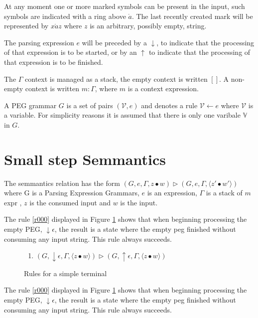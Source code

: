\documentclass[manuscript, review, sigconf]{acmart}
\newcommand{\zpp}[2]{\langle #1\bullet #2 \rangle}
\begin{document}
At any moment one or more marked symbols can be present in the input, such symbols are indicated
with a ring above $\mathring{a}$. The last recently created mark will be represented by $x\mathring{a}z$ where $z$ is an arbitrary, possibly empty, string.

The parsing expression $e$ will be preceded by a $\downarrow$, to indicate that the processing of that expression is to be started, or by an $\uparrow$ to indicate that the processing of that expression is to be finished. 

The $\Gamma$ context is managed as a stack, the empty context is written $[]$. A non-empty context is written $m : \Gamma$, where $m$ is a context expression.  

A PEG grammar $G$ is a set of pairs $(\mathcal{V},e)$ and denotes a rule $\mathcal{V} \leftarrow e$ where $\mathcal{V}$ is a variable. For simplicity reasons it is assumed that there is only one varibale $\mathbb{V}$ in $G$.  

\section{Small step Semmantics} \label{sec:sem}

The semmantics relation has the form $(G, e,\Gamma ,z \bullet w) \rhd (G, e, \Gamma, \zpp{z'}{w'})$ where G is a Parsing Expression Grammars, $e$ is an expression, $\Gamma$ is a stack of $m$ expr , $z$ is the consumed input and $w$ is the input.


The rule \ref{r000} displayed in Figure \ref{fig:rule-eps} shows that when beginning processing the empty PEG, $\downarrow \epsilon$, the result is a state where the empty peg finished without consuming any input string. This rule always succeeds.   

\begin{figure}[H]
\begin{enumerate}
  \item \label{r000} $(G, \downarrow \epsilon,\Gamma ,\zpp{z}{w})       \rhd  (G, \uparrow \epsilon, \Gamma, \zpp{z}{w})$ 
\end{enumerate}
 \caption{Rules for a simple terminal}
 \label{fig:rule-eps}
\end{figure}

The rule \ref{r000} displayed in Figure \ref{fig:rule-eps} shows that when beginning processing the empty PEG, $\downarrow \epsilon$, the result is a state where the empty peg finished without consuming any input string. This rule always succeeds.  
\end{document}
